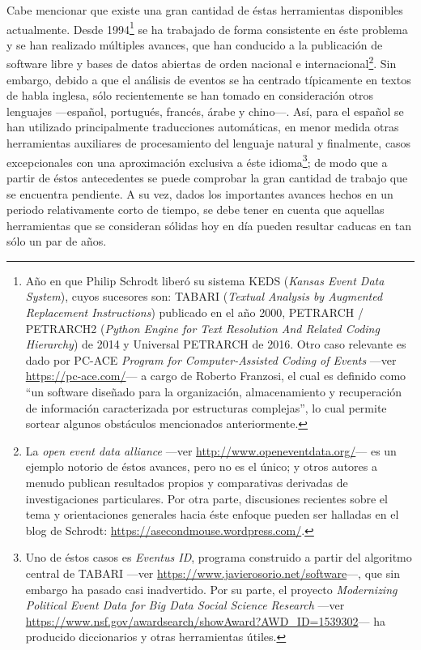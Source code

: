 \documentclass[letterpaper, 11pt]{book}
\theoremstyle{definition}
\theoremstyle{remark}
\begin{document}
Cabe mencionar que existe una gran cantidad de éstas herramientas disponibles actualmente. 
Desde 1994\footnote{
    Año en que Philip Schrodt liberó su sistema KEDS (\emph{Kansas Event Data System}), cuyos sucesores son: TABARI (\emph{Textual Analysis by Augmented Replacement Instructions}) publicado en el año 2000, PETRARCH / PETRARCH2 (\emph{Python Engine for Text Resolution And Related Coding Hierarchy}) de 2014 y Universal PETRARCH de 2016. 
    Otro caso relevante es dado por PC-ACE \emph{Program for Computer-Assisted Coding of Events} ---ver \url{https://pc-ace.com/}--- a cargo de Roberto Franzosi, el cual es definido como ``un software diseñado para la organización, almacenamiento y recuperación de información caracterizada por estructuras complejas'', lo cual permite sortear algunos obstáculos mencionados anteriormente. 
} se ha trabajado de forma consistente en éste problema y se han realizado múltiples avances, que han conducido a la publicación de software libre y bases de datos abiertas de orden nacional e internacional\footnote{
    La \emph{open event data alliance} ---ver \url{http://www.openeventdata.org/}--- es un ejemplo notorio de éstos avances, pero no es el único; \citet{2015_Danilova_Linguistic} y otros autores a menudo publican resultados propios y comparativas derivadas de investigaciones particulares. 
    Por otra parte, discusiones recientes sobre el tema y orientaciones generales hacia éste enfoque pueden ser halladas en el blog de Schrodt: \url{https://asecondmouse.wordpress.com/}. 
}. 
Sin embargo, debido a que el análisis de eventos se ha centrado típicamente en textos de habla inglesa, sólo recientemente se han tomado en consideración otros lenguajes ---español, portugués, francés, árabe y chino---. 
Así, para el español se han utilizado principalmente traducciones automáticas, en menor medida otras herramientas auxiliares de procesamiento del lenguaje natural y finalmente, casos excepcionales con una aproximación exclusiva a éste idioma\footnote{
    Uno de éstos casos es \emph{Eventus ID}, programa construido a partir del algoritmo central de TABARI ---ver \url{https://www.javierosorio.net/software}---, que sin embargo ha pasado casi inadvertido. 
    Por su parte, el proyecto \emph{Modernizing Political Event Data for Big Data Social Science Research} ---ver \url{https://www.nsf.gov/awardsearch/showAward?AWD_ID=1539302}--- ha producido diccionarios y otras herramientas útiles. 
}; de modo que a partir de éstos antecedentes se puede comprobar la gran cantidad de trabajo que se encuentra pendiente. 
A su vez, dados los importantes avances hechos en un periodo relativamente corto de tiempo, se debe tener en cuenta que aquellas herramientas que se consideran sólidas hoy en día pueden resultar caducas en tan sólo un par de años. 
\end{document}

